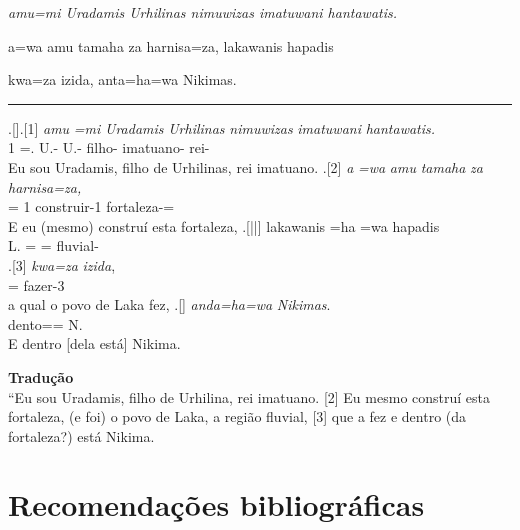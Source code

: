 \documentclass[article]{luvita}
\begin{document}
\setcounter{parcount}{0}
\begin{parnumbersa}[]

	\raggedright%
	\itshape%
	amu=mi Uradamis Urhilinas nimuwizas imatuwani hantawatis.

	a=wa amu tamaha za harnisa=za, lakawanis hapadis

	kwa=za izida, anta=ha=wa Nikimas.


\end{parnumbersa}

\vspace{10pt}
\hrule
\vspace{20pt}


\clearpage%

\ex.[]\ag.[1] \emph{amu} \emph{=mi} \emph{Uradamis} \emph{Urhilinas}
\emph{nimuwizas} \emph{imatuwani} \emph{hantawatis.}\\
\Pro{}1\Sg{} =\Refl{}. U.-\Com{}\Nom{}\Sg{} U.-\Com{}\Gen{}\Sg{} filho-\Com{}\Nom{}\Sg{}
imatuano-\Com{}\Nom{}\Sg{} rei-\Com{}\Nom{}\Sg{}\\
Eu sou Uradamis, filho de Urhilinas, rei imatuano.
\bg.[2] \emph{a} \emph{=wa} \emph{amu} \emph{tamaha} \emph{za} \emph{harnisa=za,}\\
\Conj{} =\Clt{} \Pro{}1\Sg{} construir-1\Sg{}\Pret{} \Pro{}\Neut{}\Acu{}\Sg{}
fortaleza-\Neut{}\Acu{}\Sg{}=\Clt{}\\
E eu (mesmo) construí esta fortaleza,
\bg.[||] lakawanis =ha =wa hapadis\\
L.\Com{}\Nom{}\Sg{} =\Conj{} =\Clt{} fluvial-\Com{}\Nom{}\Sg{}\\
\bg.[3] \emph{kwa=za} \emph{izida},\\
\Rel{}\Neut{}\Acu{}\Sg{}=\Clt{} fazer-3\Sg{}\Pret{}\\
a qual o povo de Laka fez,
\bg.[] \emph{anda=ha=wa} \emph{Nikimas}.\\
dento=\Conj{}=\Clt{} N.\Com{}\Nom{}\Sg{}\\
E dentro [dela está] Nikima.


\bigskip
\begin{flushleft}
	\noindent \textbf{Tradução}\\
	\noindent [1] ``Eu sou Uradamis, filho de Urhilina, rei imatuano. [2] Eu mesmo
	construí esta fortaleza, (e foi) o povo de Laka, a região fluvial, [3] que a fez e
	dentro (da fortaleza?) está Nikima.
\end{flushleft}


\chapter*{Recomendações bibliográficas}
\end{document}
